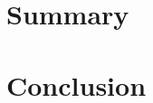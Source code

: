 \documentclass[10pt,twoside,english,a4paper]{coursepaper}
\begin{document}
\section{Summary} \label{sec:summary}


\section{Conclusion} \label{conclusion} %






\end{document}
